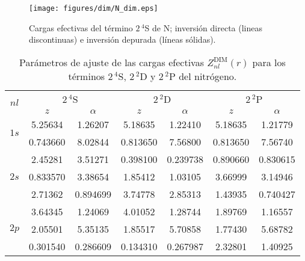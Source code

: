 \begin{figure}
\centering
\texttt{[image: figures/dim/N\_dim.eps]}
\caption[Cargas efectivas DIM de nitrógeno.]
{Cargas efectivas del término $2\,^4$S de N; 
inversión directa (lineas discontinuas) 
e inversión depurada (líneas sólidas).}
\label{fig:Nzeff}
\end{figure}

\begin{table}
\centering
\begin{tabular}{|c|c|c|c|c|c|c|}
\hline
\multirow{2}{*}{$nl$} 
  & \multicolumn{2}{c}{$2\,^4$S} 
  & \multicolumn{2}{c}{$2\,^2$D} 
  & \multicolumn{2}{c}{$2\,^2$P} \\
\cline{2-7}
       & $z$ & $\alpha$ 
       & $z$ & $\alpha$ 
       & $z$ & $\alpha$ \\
\hline
\hline
\multirow{2}{*}{$1s$} & 5.25634  & 1.26207 
       & 5.18635  & 1.22410
       & 5.18635 & 1.21779  \\
\vspace*{0.09cm}
       & 0.743660 & 8.02844 
       & 0.813650 & 7.56800
       & 0.813650 & 7.56740   \\
\hline
\multirow{3}{*}{$2s$} & 2.45281  & 3.51271 
       & 0.398100 & 0.239738
       & 0.890660 & 0.830615  \\
       & 0.833570  & 3.38654 
       & 1.85412  & 1.03105
       & 3.66999  & 3.14946   \\
\vspace*{0.09cm}
       & 2.71362  & 0.894699 
       & 3.74778  & 2.85313
       & 1.43935  & 0.740427  \\
\hline
\multirow{3}{*}{$2p$}  & 3.64345  & 1.24069 
       & 4.01052  & 1.28744
       & 1.89769  & 1.16557  \\
       & 2.05501  & 5.35135 
       & 1.85517  & 5.70858 
       & 1.77430   & 5.68782 \\
       & 0.301540 & 0.286609 
       & 0.134310  & 0.267987
       & 2.32801  & 1.40925  \\
\hline
\end{tabular}
\caption[Parámetros de ajuste de cargas efectivas de nitrógeno.]
{Parámetros de ajuste de las cargas efectivas 
$Z_{nl}^{\mathrm{DIM}}(r)$ para los términos $2\,^4$S, $2\,^2$D y
$2\,^2$P del nitrógeno.}
\label{tab:parametersNitro}
\end{table}

